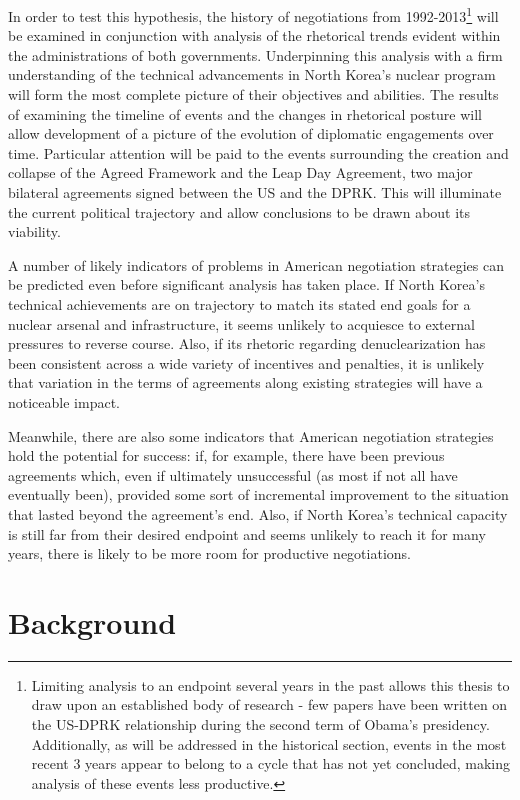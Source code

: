 \documentclass{article}
\begin{document}
In order to test this hypothesis, the history of negotiations from 1992-2013\footnote{Limiting analysis to an endpoint several years in the past allows this thesis to draw upon an established body of research - few papers have been written on the US-DPRK relationship during the second term of Obama's presidency. Additionally, as will be addressed in the historical section, events in the most recent 3 years appear to belong to a cycle that has not yet concluded, making analysis of these events less productive.} will be examined in conjunction with analysis of the rhetorical trends evident within the administrations of both governments. Underpinning this analysis with a firm understanding of the technical advancements in North Korea's nuclear program will form the most complete picture of their objectives and abilities. The results of examining the timeline of events and the changes in rhetorical posture will allow development of a picture of the evolution of diplomatic engagements over time. Particular attention will be paid to the events surrounding the creation and collapse of the Agreed Framework and the Leap Day Agreement, two major bilateral agreements signed between the US and the DPRK. This will illuminate the current political trajectory and allow conclusions to be drawn about its viability.

A number of likely indicators of problems in American negotiation strategies can be predicted even before significant analysis has taken place. If North Korea's technical achievements are on trajectory to match its stated end goals for a nuclear arsenal and infrastructure, it seems unlikely to acquiesce to external pressures to reverse course. Also, if its rhetoric regarding denuclearization has been consistent across a wide variety of incentives and penalties, it is unlikely that variation in the terms of agreements along existing strategies will have a noticeable impact.

Meanwhile, there are also some indicators that American negotiation strategies hold the potential for success: if, for example, there have been previous agreements which, even if ultimately unsuccessful (as most if not all have eventually been), provided some sort of incremental improvement to the situation that lasted beyond the agreement's end. Also, if North Korea's technical capacity is still far from their desired endpoint and seems unlikely to reach it for many years, there is likely to be more room for productive negotiations.


\section{Background}
\end{document}
